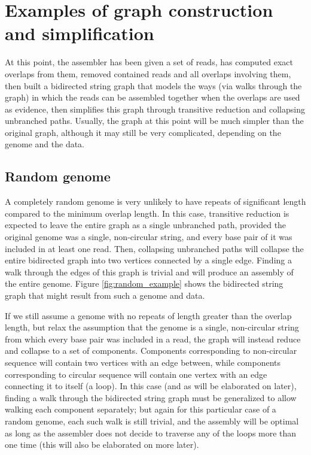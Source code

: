\documentclass[10pt]{article}
\newcommand{\Figure}[1]{Figure \ref{#1}}
\begin{document}
\section{Examples of graph construction and simplification}

At this point, the assembler has been given a set of reads, has computed exact
overlaps from them, removed contained reads and all overlaps involving them,
then built a bidirected string graph that models the ways (via walks through the
graph) in which the reads can be assembled together when the overlaps are used
as evidence, then simplifies this graph through transitive reduction and
collapsing unbranched paths.  Usually, the graph at this point will be much
simpler than the original graph, although it may still be very complicated,
depending on the genome and the data.

\subsection{Random genome}

A completely random genome is very unlikely to have repeats of significant
length compared to the minimum overlap length.  In this case, transitive
reduction is expected to leave the entire graph as a single unbranched path,
provided the original genome was a single, non-circular string, and every base
pair of it was included in at least one read.  Then, collapsing unbranched paths
will collapse the entire bidirected graph into two vertices connected by a
single edge.  Finding a walk through the edges of this graph is trivial and will
produce an assembly of the entire genome.  \Figure{fig:random_example} shows the
bidirected string graph that might result from such a genome and data.

If we still assume a genome with no repeats of length greater than the overlap
length, but relax the assumption that the genome is a single, non-circular
string from which every base pair was included in a read, the graph will instead
reduce and collapse to a set of components.  Components corresponding to
non-circular sequence will contain two vertices with an edge between, while
components corresponding to circular sequence will contain one vertex with an
edge connecting it to itself (a loop).  In this case (and as will be elaborated
on later), finding a walk through the bidirected string graph must be
generalized to allow walking each component separately; but again for this
particular case of a random genome, each such walk is still trivial, and the
assembly will be optimal as long as the assembler does not decide to traverse
any of the loops more than one time (this will also be elaborated on more
later).
\end{document}
